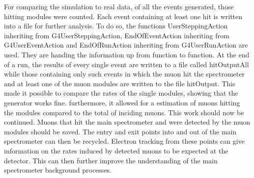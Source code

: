   For comparing the simulation to real data, of all the events generated, those hitting modules were counted. Each event containing at least one hit is written into a file for further analysis. To do so, the functions UserSteppingAction inheriting from G4UserSteppingAction, EndOfEventAction inheriting from G4UserEventAction and EndOfRunAction inheriting from G4UserRunAction are used.  They are handing the information up from function to function. 
  At the end of a run, the results of every single event are written to a file called hitOutputAll while those containing only such events in which the muon hit the spectrometer and at least one of the muon modules are written to the file hitOutput.
  This made it possible to compare the rates of the single modules, showing that the generator works fine. furthermore, it allowed for a estimation of muons hitting the modules compared to the total of inciding muons.
  This work should now be continued. Muons that hit the main spectrometer and were detected by the muon modules should be saved. The entry and exit points into and out of the main spectrometer can then be recycled. Electron tracking from these points can give information on the rates induced by detected muons to be expected at the detector. This can then further improve the understanding of the main spectrometer background processes. 
  
  
  
  
  